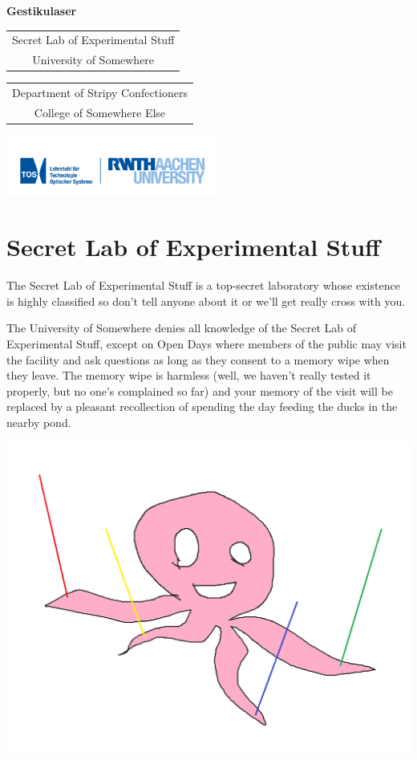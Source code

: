 \documentclass[a4paper,12pt,notumble]{leaflet}
\begin{document}
\begin{center}\bfseries\Huge
Gestikulaser

\vfill

\normalsize
\begin{tabular}{c}
Secret Lab of Experimental Stuff\\
University of Somewhere
\end{tabular}

\vfill

\begin{tabular}{c}
Department of Stripy Confectioners\\
College of Somewhere Else
\end{tabular}

\vfill

\includegraphics[height=2cm]{Logos/TOS.png}
\end{center}

\newpage
\raggedright

\section{Secret Lab of Experimental Stuff}

The Secret Lab of Experimental Stuff is a top-secret laboratory
whose existence is highly classified so don't tell anyone about it
or we'll get really cross with you.

The University of Somewhere denies all knowledge of the Secret Lab
of Experimental Stuff, except on Open Days where members of the
public may visit the facility and ask questions as long as they
consent to a memory wipe when they leave. The memory wipe is
harmless (well, we haven't really tested it properly, but no one's
complained so far) and your memory of the visit will be replaced by
a pleasant recollection of spending the day feeding the ducks in the
nearby pond.

\begin{flushright}
\includegraphics[scale=0.2]{Logos/gestikulaser.png}
\end{flushright}
\end{document}
